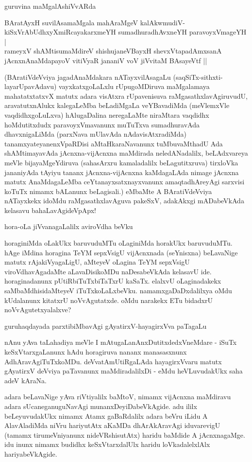 guruvina maMgalAshiVvARda

\begin{shloka}
BAratAyxH suvilAsamaMgala mahAraMgeV kalAkwmudiV-\\
kiSxVrAbUdhxyXmiRcayakarxmeYH sumadhuradhAvxneYH paravoyxVmageYH |\\
rameyxV shAMtisumaMdireV shishujaneVBayxH shevxVtapadAmxsanA\\
jAcnxnAnaMdapayoV vitiVyaR jananiV voV jiVvitaM BAsayeVtf ||
\end{shloka}

(BAratiVdeVviya jagadAnaMdakara nATayxvilAsagaLu (saqSiTx-sithxti-layarUpavAdavu) vayxkatxgoLaLxlu rUpugoMDiruva maMgalamaya mahatatxtatxvX matutx adara visAtxra rUpavenisuva raMgasathxlavAgiruvudU, aravatutxnAlukx kalegaLeMba beLadiMgaLa veYBavadiMda (meVlemxVle vaqdidhxgoLuLxva) hAlugaDalina neregaLaMte niraMtara vaqdidhx hoMdutitxdudx paravoyxVmavanunx muTuTxva sumadhuravAda dhavxnigaLiMda (parxNava mUlavAda nAdavisAtxradiMda) tanamxyateyanenxVpaRDisi aMtaHkaraNavanunx tuMbuvaMthadU Ada shAMtimayavAda jAcnxna-vijAcnxna maMdirada neledANadalilx, beLAdxvareya meVle bijayaMgeYdiruva (sahasArxru kamaladalilx beLagutitxruva) tirxloVka jananiyAda tAyiyu tananx jAcnxna-vijAcnxna kaMdagaLAda nimage jAcnxna matutx AnaMdagaLeMba ceYtanayxsatxnayxvanunx amaqtadhAreyAgi sarxvisi koTuTx nimamx bALanunx beLagisali.) eMbaMte A BAratiVdeVviya nATayxkekx idoMdu raMgasathxlavAguva pakeSxV, adakAkxgi mADabeVkAda kelasavu bahaLavAgideVpApx!

hora-oLa jiVvanagaLalilx aviroVdha beVku

horaginiMda oLakUkx baruvuduMTu oLaginiMda horakUkx baruvuduMTu. hAge iMdina horagina TeYM sepxVsigU vijAcnxnada (seYnisxna) beLavaNige matutx rAjakiVyagaLigU, aMteyeV oLagina TeYM sepxVsigU viroVdhavAgadaMte aLavaDisikoMDu naDesabeVkAda kelasavU ide. horaginadanunx pUtiRbiTuTxbiTaTxrU kaSaTx. elalxvU oLaginadakekx saMbaMdhisidaMteyeV iTuTxkoLaLxbeVku. namamxgaDaDxdalilxya oMdu kUdalanunx kitatxrU noVvAgutatxde. oMdu narakekx ETu bidadxrU noVvAgutetxyalalxve?

guruhaqdayada parxtibiMbavAgi gAyatirxV-hayagirxVva paTagaLu

nAnu yAva taLahadiya meVle I mAtugaLanAnxDutitxdedxVneMdare - iSuTx keSxVtarxgaLanunx hAdu horagiruva nananx manasasxnunx AdhAravAgiTuTxkoMDu. deVvatAmUtiRgaLAda hayagirxVvaru matutx gAyatirxV deVviya paTavanunx maMdiradalilxDi - eMdu heVLuvudakUkx saha adeV kAraNa.

adara beLavaNige yAva riVtiyalilx baMtoV, nimamx vijAcnxna maMdiravu adara sUcaneganuguNavAgi munanxDeyiDabeVkAgide. adu ililx beLeyuvudakUkx nimamx Atamx gaBaRdalilx adara beVru iLidu A AlavAladiMda niVru hariyutAtx aKaMDa dhArAkAravAgi iduvarevigU (tamamx tirumeVniyanunx nideVRshisutAtx) haridu baMdide A jAcnxnagaMge. idu inunx nimamx budidhx keSxVtarxdalUlx haridu loVkadalelxlAlx hariyabeVkAgide.

